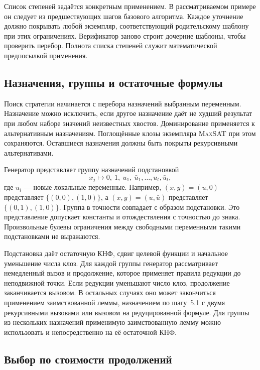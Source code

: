 \documentclass[10pt,twoside]{article}
\newcommand{\MaxSAT}{\textnormal{\textsc{MaxSAT}}}
\theoremstyle{definition}
\theoremstyle{remark}
\begin{document}
Список степеней задаётся конкретным применением. В рассматриваемом примере
он следует из предшествующих шагов базового алгоритма. Каждое уточнение
должно покрывать любой экземпляр, соответствующий родительскому шаблону
при этих ограничениях. Верификатор заново строит дочерние шаблоны, чтобы
проверить перебор. Полнота списка степеней служит математической
предпосылкой применения.

\subsection{Назначения, группы и остаточные формулы}
\label{sec:group-search}

Поиск стратегии начинается с перебора назначений выбранным переменным.
Назначение можно исключить, если другое назначение даёт не худший результат
при любом наборе значений неизвестных хвостов. Доминирование применяется к
альтернативным назначениям. Поглощённые клозы экземпляра \MaxSAT{} при
этом сохраняются. Оставшиеся назначения должны быть покрыты рекурсивными
альтернативами.

Генератор представляет группу назначений подстановкой
\begin{equation}
 x_j\longmapsto 0,\ 1,\ u_1,\ \bar u_1,\ldots,u_t,\bar u_t,
 \label{eq:substitution}
\end{equation}
где $u_i$ --- новые локальные переменные. Например, $(x,y)=(u,0)$
представляет $\{(0,0),(1,0)\}$, а $(x,y)=(u,\bar u)$ представляет
$\{(0,1),(1,0)\}$. Группа в точности совпадает с образом подстановки.
Это представление допускает константы и отождествления с точностью до
знака. Произвольные булевы ограничения между свободными переменными
такими подстановками не выражаются.

Подстановка даёт остаточную КНФ, сдвиг целевой функции и начальное
уменьшение числа клоз. Для каждой группы генератор рассматривает
немедленный вызов и продолжение, которое применяет правила редукции до
неподвижной точки. Если редукции уменьшают число клоз, продолжение
заканчивается вызовом. В остальных случаях оно может закончиться
применением заимствованной леммы, назначением по шагу~5.1 с двумя
рекурсивными вызовами или вызовом на редуцированной формуле. Для группы
из нескольких назначений применимую заимствованную лемму можно
использовать и непосредственно на её остаточной КНФ.

\subsection{Выбор по стоимости продолжений}
\label{sec:fixed-target}
\end{document}

